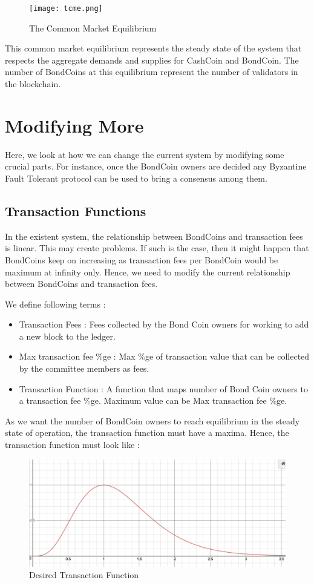 \begin{figure}[!htbp]
\centering
\texttt{[image: tcme.png]}
\caption{The Common Market Equilibrium}
\label{fig35}
\end{figure}

This common market equilibrium represents the steady state of the system that respects the aggregate demands and supplies for CashCoin and BondCoin. The number of BondCoins at this equilibrium represent the number of validators in the blockchain.

\section{Modifying More}

Here, we look at how we can change the current system by modifying some crucial parts. For instance, once the BondCoin owners are decided any Byzantine Fault Tolerant protocol can be used to bring a consensus among them.

\subsection{Transaction Functions}

In the existent system, the relationship between BondCoins and transaction fees is linear. This may create problems. If such is the case, then it might happen that BondCoins keep on increasing as transaction fees per BondCoin would be maximum at infinity only. Hence, we need to modify the current relationship between BondCoins and transaction fees.

We define following terms :
\begin{itemize}
    \item Transaction Fees : Fees collected by the Bond Coin owners for working to add a new block to the ledger.
    \item Max transaction fee \%ge : Max \%ge of transaction value that can be collected by the committee members as fees.
    \item Transaction Function : A function that maps number of Bond Coin owners to a transaction fee \%ge. Maximum value can be Max transaction fee \%ge.
\end{itemize}

As we want the number of BondCoin owners to reach equilibrium in the steady state of operation, the transaction function must have a maxima. Hence, the transaction function must look like : 

\begin{figure}[!htbp]
\centering
\includegraphics[width=14cm]{Pictures/desiredTF.png}
\caption{Desired Transaction Function}
\end{figure}

